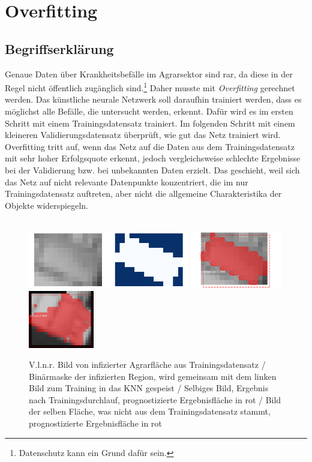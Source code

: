 \chapter{Overfitting}\label{chap:overfitting}

\section{Begriffserklärung}\label{sec:what-is-overfitting}

Genaue Daten über Krankheitsbefälle im Agrarsektor sind rar, da diese in der Regel nicht öffentlich zugänglich sind.\footnote{Datenschutz kann ein Grund dafür sein.}  Daher musste mit \textit{Overfitting} gerechnet werden. Das künstliche neurale Netzwerk soll daraufhin trainiert werden, dass es möglichst alle Befälle, die untersucht werden, erkennt. Dafür wird es im ersten Schritt mit einem Trainingsdatensatz trainiert. Im folgenden Schritt mit einem kleineren Validierungsdatensatz überprüft, wie gut das Netz trainiert wird. Overfitting tritt auf, wenn das Netz auf die Daten aus dem Trainingsdatensatz mit sehr hoher Erfolgsquote erkennt, jedoch vergleichsweise schlechte Ergebnisse bei der Validierung bzw. bei unbekannten Daten erzielt. Das geschieht, weil sich das Netz auf nicht relevante Datenpunkte konzentriert, die im nur Trainingsdatensatz auftreten, aber nicht die allgemeine Charakteristika der Objekte widerspiegeln. 
\\\\
\begin{figure}[ht]
  \centering
  \includegraphics[height=2.5cm]{pics/mask.png}
  \includegraphics[height=2.5cm]{pics/pred.png}
  \includegraphics[height=2.5cm]{pics/bad-pred.png}
  \caption[Beispiel Overfitting]{V.l.n.r. Bild von infizierter Agrarfläche aus Trainingsdatensatz / Binärmaske der infizierten Region, wird gemeinsam mit dem linken Bild zum Training in das KNN gespeist / Selbiges Bild, Ergebnis nach Trainingsdurchlauf, prognostizierte Ergebnisfläche in rot / Bild der selben Fläche, was nicht aus dem Trainingsdatensatz stammt, prognostizierte Ergebnisfläche in rot}
  \label{fig:example-overfitting}
\end{figure}
